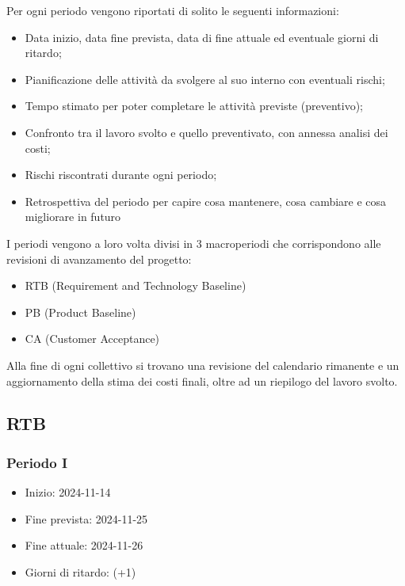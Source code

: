 Per ogni periodo vengono riportati di solito le seguenti informazioni:
\begin{itemize}
    \item Data inizio, data fine prevista, data di fine attuale ed eventuale giorni di ritardo;
    \item Pianificazione delle attività da svolgere al suo interno con eventuali rischi;
    \item Tempo stimato per poter completare le attività previste (preventivo);
    \item Confronto tra il lavoro svolto e quello preventivato, con annessa analisi dei costi;
    \item Rischi riscontrati durante ogni periodo;
    \item Retrospettiva del periodo per capire cosa mantenere, cosa cambiare e cosa migliorare in futuro
\end{itemize}

I periodi vengono a loro volta divisi in 3 macroperiodi che corrispondono alle revisioni di avanzamento del progetto:
\begin{itemize}
    \item RTB (Requirement and Technology Baseline)
    \item PB (Product Baseline)
    \item CA (Customer Acceptance)
\end{itemize}
Alla fine di ogni collettivo si trovano una revisione del calendario rimanente e un aggiornamento della stima dei costi finali, oltre ad un riepilogo del lavoro svolto.
\subsection{RTB}
\subsubsection{Periodo I}
\begin{itemize}
    \item Inizio: 2024-11-14
    \item Fine prevista: 2024-11-25
    \item Fine attuale: 2024-11-26
    \item Giorni di ritardo: (+1)
\end{itemize}
